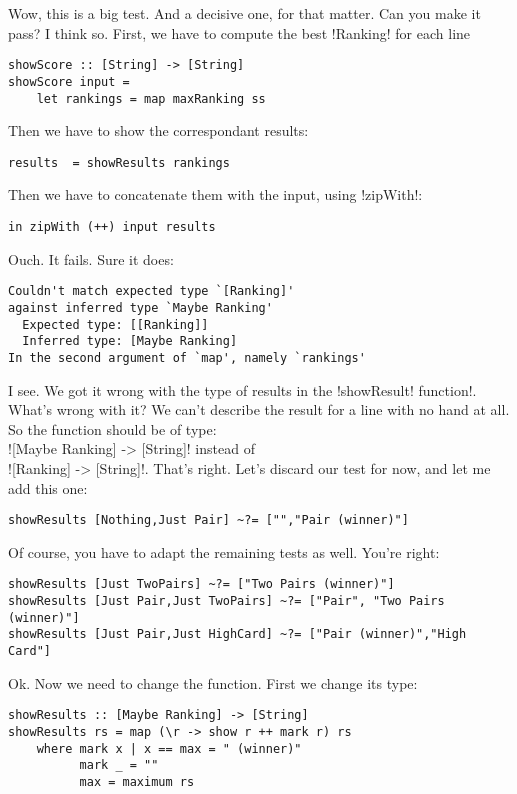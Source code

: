 \lhA \error Wow, this is a big test.
\lhN And a decisive one, for that matter. Can you make it pass?
\lhA \error I think so. First, we have to compute the best \il!Ranking! for each line
\begin{lstlisting}[frame=single]
showScore :: [String] -> [String]
showScore input = 
    let rankings = map maxRanking ss
\end{lstlisting}
Then we have to show the correspondant results:
\begin{lstlisting}[frame=single]
        results  = showResults rankings
\end{lstlisting}
Then we have to concatenate them with the input, using \il!zipWith!:
\begin{lstlisting}[frame=single]
    in zipWith (++) input results
\end{lstlisting}
\error Ouch. It fails.
\lhN Sure it does:
\begin{small}
\begin{verbatim}
Couldn't match expected type `[Ranking]'
against inferred type `Maybe Ranking'
  Expected type: [[Ranking]]
  Inferred type: [Maybe Ranking]
In the second argument of `map', namely `rankings'
\end{verbatim}
\end{small}
\lhA \error I see. We got it wrong with the type of results in the \il!showResult! function!.
\lhN What's wrong with it?
\lhA We can't describe the result for a line with no hand at all. So the function should be of type: \\ \il![Maybe Ranking] -> [String]! instead of \\ \il![Ranking] -> [String]!.
\lhN That's right. Let's discard our test for now, and let me add this one:
\begin{lstlisting}[frame=single]
showResults [Nothing,Just Pair] ~?= ["","Pair (winner)"]
\end{lstlisting}
\lhA \error Of course, you have to adapt the remaining tests as well.
\lhN You're right:
\begin{lstlisting}[frame=single]
showResults [Just TwoPairs] ~?= ["Two Pairs (winner)"] 
showResults [Just Pair,Just TwoPairs] ~?= ["Pair", "Two Pairs (winner)"]
showResults [Just Pair,Just HighCard] ~?= ["Pair (winner)","High Card"] 
\end{lstlisting}
\lhA \error Ok. Now we need to change the function. First we change its type:
\begin{lstlisting}[frame=single]
showResults :: [Maybe Ranking] -> [String]
showResults rs = map (\r -> show r ++ mark r) rs
    where mark x | x == max = " (winner)"
          mark _ = ""
          max = maximum rs
\end{lstlisting}

